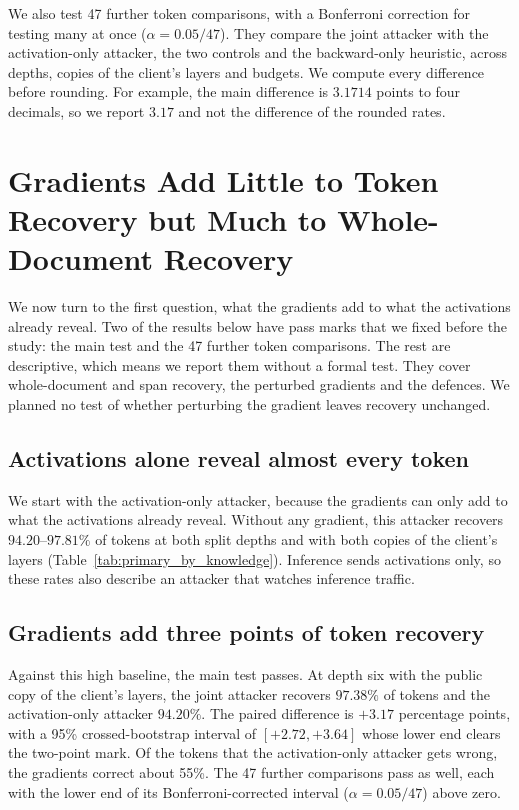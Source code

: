 \documentclass[11pt]{article}
\begin{document}
We also test 47 further token comparisons, with a Bonferroni correction for testing many at once ($\alpha = 0.05/47$). They compare the joint attacker with the activation-only attacker, the two controls and the backward-only heuristic, across depths, copies of the client's layers and budgets. We compute every difference before rounding. For example, the main difference is $3.1714$ points to four decimals, so we report $3.17$ and not the difference of the rounded rates.

\section{Gradients Add Little to Token Recovery but Much to Whole-Document Recovery}
\label{sec:joint}
We now turn to the first question, what the gradients add to what the activations already reveal. Two of the results below have pass marks that we fixed before the study: the main test and the 47 further token comparisons. The rest are descriptive, which means we report them without a formal test. They cover whole-document and span recovery, the perturbed gradients and the defences. We planned no test of whether perturbing the gradient leaves recovery unchanged.

\subsection{Activations alone reveal almost every token}
\label{sec:activations}
We start with the activation-only attacker, because the gradients can only add to what the activations already reveal. Without any gradient, this attacker recovers $94.20$--$97.81\%$ of tokens at both split depths and with both copies of the client's layers (Table~\ref{tab:primary_by_knowledge}). Inference sends activations only, so these rates also describe an attacker that watches inference traffic.

\subsection{Gradients add three points of token recovery}
Against this high baseline, the main test passes. At depth six with the public copy of the client's layers, the joint attacker recovers $97.38\%$ of tokens and the activation-only attacker $94.20\%$. The paired difference is $+3.17$ percentage points, with a 95\% crossed-bootstrap interval of $[+2.72, +3.64]$ whose lower end clears the two-point mark. Of the tokens that the activation-only attacker gets wrong, the gradients correct about 55\%. The 47 further comparisons pass as well, each with the lower end of its Bonferroni-corrected interval ($\alpha = 0.05/47$) above zero.
\end{document}

